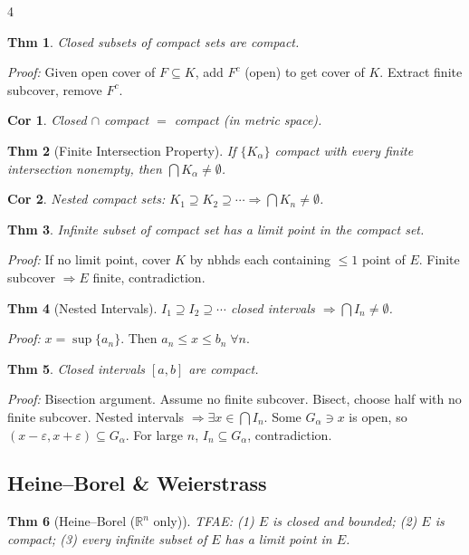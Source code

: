 \documentclass[9pt,landscape]{extarticle}
\newcommand{\R}{\mathbb{R}}
\newcommand{\eps}{\varepsilon}
\theoremstyle{compact}
\newtheorem*{thm}{Thm}
\newtheorem*{cor}{Cor}
\begin{document}
\begin{multicols}{4}
\begin{thm}
Closed subsets of compact sets are compact.
\end{thm}
\textit{Proof:} Given open cover of $F \subseteq K$, add $F^c$ (open) to get cover of $K$. Extract finite subcover, remove $F^c$.

\begin{cor}
Closed $\cap$ compact $=$ compact (in metric space).
\end{cor}

\begin{thm}[Finite Intersection Property]
If $\{K_\alpha\}$ compact with every finite intersection nonempty, then $\bigcap K_\alpha \neq \emptyset$.
\end{thm}

\begin{cor}
Nested compact sets: $K_1 \supseteq K_2 \supseteq \cdots \Rightarrow \bigcap K_n \neq \emptyset$.
\end{cor}

\begin{thm}
Infinite subset of compact set has a limit point in the compact set.
\end{thm}
\textit{Proof:} If no limit point, cover $K$ by nbhds each containing $\leq 1$ point of $E$. Finite subcover $\Rightarrow E$ finite, contradiction.

\begin{thm}[Nested Intervals]
$I_1 \supseteq I_2 \supseteq \cdots$ closed intervals $\Rightarrow \bigcap I_n \neq \emptyset$.
\end{thm}
\textit{Proof:} $x = \sup\{a_n\}$. Then $a_n \leq x \leq b_n\;\forall n$.

\begin{thm}
Closed intervals $[a,b]$ are compact.
\end{thm}
\textit{Proof:} Bisection argument. Assume no finite subcover. Bisect, choose half with no finite subcover. Nested intervals $\Rightarrow \exists x \in \bigcap I_n$. Some $G_\alpha \ni x$ is open, so $(x-\eps,x+\eps) \subseteq G_\alpha$. For large $n$, $I_n \subseteq G_\alpha$, contradiction.

\subsection{Heine--Borel \& Weierstrass}

\begin{thm}[Heine--Borel ($\R^n$ only)]
TFAE: (1) $E$ is closed and bounded; (2) $E$ is compact; (3) every infinite subset of $E$ has a limit point in $E$.
\end{thm}


\end{multicols}
\end{document}
